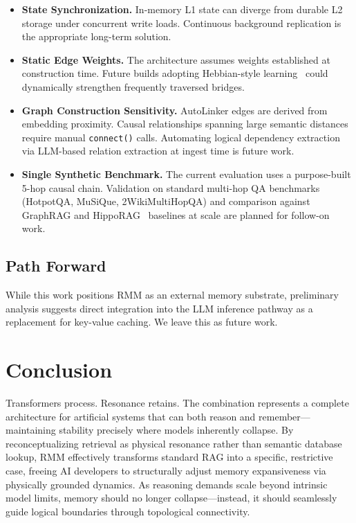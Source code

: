 \documentclass[11pt]{article}
\begin{document}
\begin{itemize}
  \item \textbf{State Synchronization.} In-memory L1 state can diverge
        from durable L2 storage under concurrent write loads.
        Continuous background replication is the appropriate long-term
        solution.
  \item \textbf{Static Edge Weights.} The architecture assumes weights
        established at construction time. Future builds adopting
        Hebbian-style learning~\cite{amit1989} could dynamically
        strengthen frequently traversed bridges.
  \item \textbf{Graph Construction Sensitivity.} AutoLinker edges are
        derived from embedding proximity. Causal relationships spanning
        large semantic distances require manual \texttt{connect()} calls.
        Automating logical dependency extraction via LLM-based relation
        extraction at ingest time is future work.
  \item \textbf{Single Synthetic Benchmark.} The current evaluation uses
        a purpose-built 5-hop causal chain. Validation on standard
        multi-hop QA benchmarks (HotpotQA, MuSiQue, 2WikiMultiHopQA)
        and comparison against GraphRAG and
        HippoRAG~\cite{gutierrez2024hipporag} baselines at scale are
        planned for follow-on work.
\end{itemize}

\subsection{Path Forward}

While this work positions RMM as an external memory substrate,
preliminary analysis suggests direct integration into the LLM inference
pathway as a replacement for key-value caching. We leave this as future
work.

\section{Conclusion}

Transformers process. Resonance retains. The combination represents a
complete architecture for artificial systems that can both reason and
remember---maintaining stability precisely where models inherently
collapse. By reconceptualizing retrieval as physical resonance rather
than semantic database lookup, RMM effectively transforms standard RAG
into a specific, restrictive case, freeing AI developers to structurally
adjust memory expansiveness via physically grounded dynamics. As
reasoning demands scale beyond intrinsic model limits, memory should no
longer collapse---instead, it should seamlessly guide logical boundaries
through topological connectivity.
\end{document}
